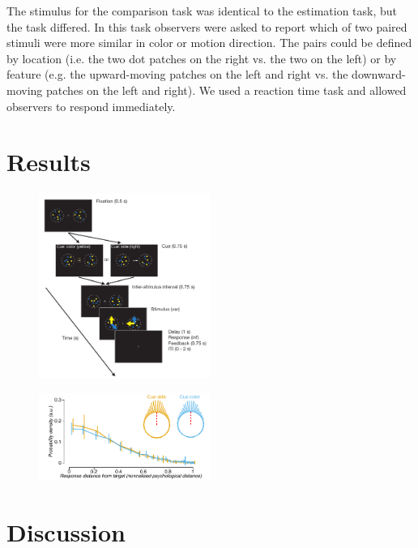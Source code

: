 The stimulus for the comparison task was identical to the estimation task, but the task differed. In this task observers were asked to report which of two paired stimuli were more similar in color or motion direction. The pairs could be defined by location (i.e. the two dot patches on the right vs. the two on the left) or by feature (e.g. the upward-moving patches on the left and right vs. the downward-moving patches on the left and right). We used a reaction time task and allowed observers to respond immediately. 

\section{Results}


\begin{figure}
\centering
\includegraphics[keepaspectratio,width=0.5\textwidth]{figs_c4/f1_task.pdf}
\caption[Behavioral task]{}
\label{fig:c4f1}
\end{figure}


\begin{figure}
\centering
\includegraphics[keepaspectratio,width=0.5\textwidth]{figs_c4/f2_aca_perf.pdf}
\caption[Behavioral task]{}
\label{fig:c4f2}
\end{figure}


\section{Discussion}

